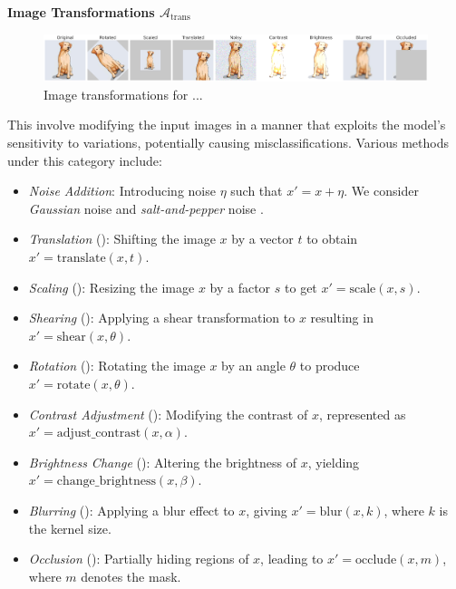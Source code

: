 \documentclass[10pt, conference, a4paper, final]{IEEEtran}
\begin{document}
\smallskip\noindent%
\textbf{Image Transformations $\mathcal{A}_{\text{trans}}$}

\begin{figure}
  \centering
  
  \includegraphics[width=\linewidth]{paper_images/output_update.png}
  
  \caption{Image transformations for ...}
  \label{fig:image-trans}
\end{figure}

This involve modifying the input images in a manner that exploits the model's sensitivity to variations, potentially causing misclassifications. Various methods under this category include:
\begin{itemize}[$\bullet$]
    \item \emph{Noise Addition}: Introducing noise $\eta$ such that $x' = x + \eta$.  We consider  \emph{Gaussian} noise \gaussian and \emph{salt-and-pepper} noise \saltpepper.
    \item \emph{Translation} (\translation): Shifting the image $x$ by a vector $t$ to obtain $x' = \text{translate}(x, t)$.
    \item \emph{Scaling} (\scale): Resizing the image $x$ by a factor $s$ to get $x' = \text{scale}(x, s)$.
    \item \emph{Shearing} (\shear): Applying a shear transformation to $x$ resulting in $x' = \text{shear}(x, \theta)$.
    \item \emph{Rotation} (\rotation): Rotating the image $x$ by an angle $\theta$ to produce $x' = \text{rotate}(x, \theta)$.
    \item \emph{Contrast Adjustment} (\contrast): Modifying the contrast of $x$, represented as $x' = \text{adjust\_contrast}(x, \alpha)$.
    \item \emph{Brightness Change} (\brightness): Altering the brightness of $x$, yielding $x' = \text{change\_brightness}(x, \beta)$.
    \item \emph{Blurring} (\blur): Applying a blur effect to $x$, giving $x' = \text{blur}(x, k)$, where $k$ is the kernel size.
    \item \emph{Occlusion} (\occlusion): Partially hiding regions of $x$, leading to $x' = \text{occlude}(x, m)$, where $m$ denotes the mask.
\end{itemize}
\end{document}
